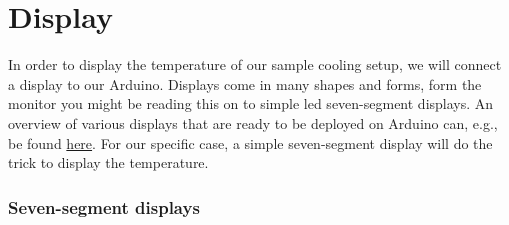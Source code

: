 
\chapter{Display}

In order to display the temperature of our sample cooling setup, we will connect a display to our Arduino. Displays come in many shapes and forms, form the monitor you might be reading this on to simple \ac{led} seven-segment displays. An overview of various displays that are ready to be deployed on Arduino can, e.g., be found \href{https://www.arduino.cc/reference//en/libraries/category/display/}{here}. For our specific case, a simple seven-segment display will do the trick to display the temperature.

\subsection{Seven-segment displays} 

